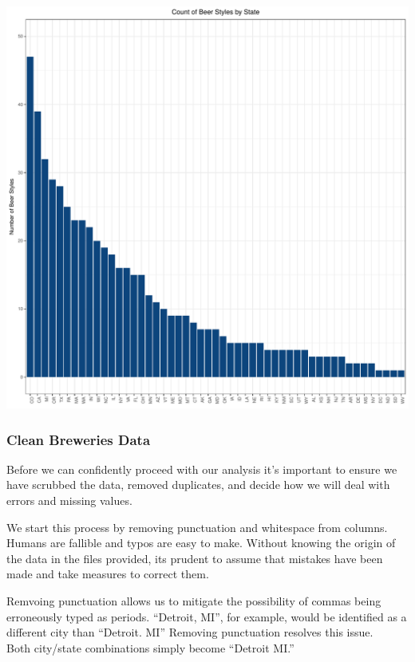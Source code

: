 \documentclass[]{article}
\begin{document}
\begin{center}\includegraphics{Analysis_Final_files/figure-latex/unnamed-chunk-3-1} \end{center}

\subsubsection{Clean Breweries Data}\label{clean-breweries-data}

Before we can confidently proceed with our analysis it's important to
ensure we have scrubbed the data, removed duplicates, and decide how we
will deal with errors and missing values.

We start this process by removing punctuation and whitespace from
columns. Humans are fallible and typos are easy to make. Without knowing
the origin of the data in the files provided, its prudent to assume that
mistakes have been made and take measures to correct them.

Remvoing punctuation allows us to mitigate the possibility of commas
being erroneously typed as periods. ``Detroit, MI'', for example, would
be identified as a different city than ``Detroit. MI'' Removing
punctuation resolves this issue.\\
Both city/state combinations simply become ``Detroit MI.''
\end{document}
